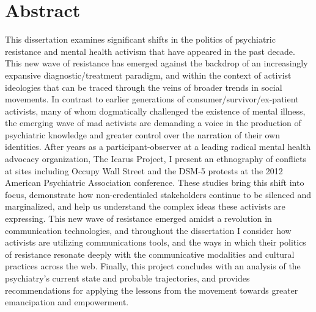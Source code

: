 %
\chapter*{Abstract}
\label{sec:abstract}
\vspace*{-10mm}

This dissertation examines significant shifts in the politics of psychiatric resistance and mental health activism that have appeared in the past decade. This new wave of resistance has emerged against the backdrop of an increasingly expansive diagnostic/treatment paradigm, and within the context of activist ideologies that can be traced through the veins of broader trends in social movements. In contrast to earlier generations of consumer/survivor/ex-patient activists, many of whom dogmatically challenged the existence of mental illness, the emerging wave of mad activists are demanding a voice in the production of psychiatric knowledge and greater control over the narration of their own identities. After years as a participant-observer at a leading radical mental health advocacy organization, The Icarus Project, I present an ethnography of conflicts at sites including Occupy Wall Street and the DSM-5 protests at the 2012 American Psychiatric Association conference. These studies bring this shift into focus, demonstrate how non-credentialed stakeholders continue to be silenced and marginalized, and help us understand the complex ideas these activists are expressing. This new wave of resistance emerged amidst a revolution in communication technologies, and throughout the dissertation I consider how activists are utilizing communications tools, and the ways in which their politics of resistance resonate deeply with the communicative modalities and cultural practices across the web. Finally, this project concludes with an analysis of the psychiatry’s current state and probable trajectories, and provides recommendations for applying the lessons from the movement towards greater emancipation and empowerment.


